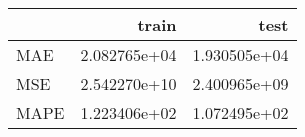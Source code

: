 \begin{tabular}{lrr}
\toprule
{} &         train &          test \\
\midrule
MAE  &  2.082765e+04 &  1.930505e+04 \\
MSE  &  2.542270e+10 &  2.400965e+09 \\
MAPE &  1.223406e+02 &  1.072495e+02 \\
\bottomrule
\end{tabular}
